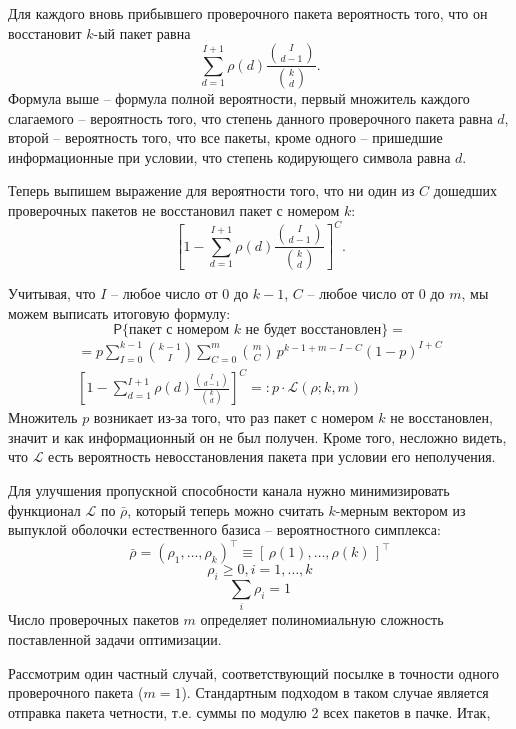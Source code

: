 Для каждого вновь прибывшего проверочного пакета вероятность того, что
он восстановит $k$-ый пакет равна
\[\sum_{d=1}^{I + 1}\rho(d)\frac{\binom{I}{d-1}}{\binom{k}{d}}.\]
Формула выше -- формула полной вероятности, первый множитель
каждого слагаемого -- вероятность того, что степень данного 
проверочного пакета равна $d$, второй -- вероятность того, что
все пакеты, кроме одного -- пришедшие информационные при условии, что
степень кодирующего символа равна $d$.

Теперь выпишем выражение для вероятности того, что ни один из $C$ дошедших
проверочных пакетов не восстановил пакет с номером $k$:
\[\left[
    1 - \sum_{d=1}^{I + 1}\rho(d)\frac{\binom{I}{d-1}}{\binom{k}{d}}
\right]^C.\]

Учитывая, что $I$ -- любое число от 0 до $k - 1$,
$C$ -- любое число от 0 до $m$, мы можем выписать итоговую формулу:
\[
\mathsf P\{\text{пакет с номером $k$ не будет восстановлен}\} =
\]
\begin{multline*}
=p\sum_{I=0}^{k-1}\binom{k - 1}{I}\sum_{C=0}^{m}\binom{m}{C}\,
p^{k - 1 + m - I - C}(1-p)^{I + C}\\
\left[
    1 - \sum_{d=1}^{I + 1}\rho(d)\frac{\binom{I}{d-1}}{\binom{k}{d}}
\right]^C =: p\cdot \mathcal L(\rho; k, m) 
\end{multline*}
Множитель $p$ возникает из-за того, что раз пакет с номером
$k$ не восстановлен, значит и как информационный он не был получен. Кроме того,
несложно видеть, что $\mathcal L$ есть вероятность невосстановления пакета
при условии его неполучения.

Для улучшения пропускной способности канала нужно минимизировать функционал $\mathcal L$ по $\bar\rho$, который 
теперь можно считать $k$-мерным вектором из выпуклой оболочки естественного базиса
-- вероятностного симплекса:
\[\bar\rho=(\rho_1, \dots, \rho_k)^\top\equiv
\left[\,\rho(1), \dots, \rho(k)\,\right]^\top\]
\[\rho_i \ge 0, i = 1, \dots, k\]
\[\sum_i \rho_i = 1\]
Число проверочных пакетов $m$ определяет полиномиальную сложность 
поставленной задачи
оптимизации. 

Рассмотрим один частный случай, соответствующий посылке в точности одного 
проверочного пакета ($m=1$).
Стандартным подходом в таком случае является отправка
пакета четности, т.е. суммы по модулю 2 всех пакетов в пачке. Итак,

